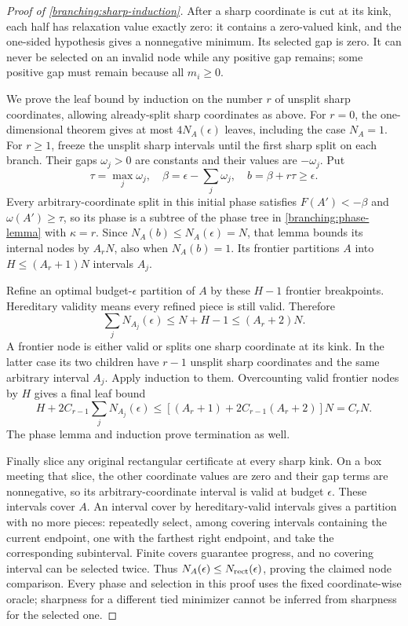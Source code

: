 \begin{proof}[Proof of \cref{branching:sharp-induction}]
After a sharp coordinate is cut at its kink, each half has relaxation
value exactly zero: it contains a zero-valued kink, and the one-sided
hypothesis gives a nonnegative minimum. Its selected gap is zero.
It can never be selected on an invalid node while any positive gap
remains; some positive gap must remain because all $m_i\ge0$.

We prove the leaf bound by induction on the number $r$ of unsplit
sharp coordinates, allowing already-split sharp coordinates as above.
For $r=0$, the one-dimensional theorem gives at most $4N_A(\epsilon)$
leaves, including the case $N_A=1$.
For $r\ge1$, freeze the unsplit sharp intervals until the first sharp
split on each branch. Their gaps $\omega_j>0$ are constants and their
values are $-\omega_j$. Put
\[
 \tau=\max_j\omega_j,\quad
 \beta=\epsilon-\sum_j\omega_j,\quad
 b=\beta+r\tau\ge\epsilon.
\]
Every arbitrary-coordinate split in this initial phase satisfies
$F(A')<-\beta$ and $\omega(A')\ge\tau$, so its phase is a subtree
of the phase tree in \cref{branching:phase-lemma} with $\kappa=r$.
Since $N_A(b)\le N_A(\epsilon)=N$, that lemma bounds its internal
nodes by $A_rN$, also when $N_A(b)=1$. Its frontier partitions $A$
into $H\le(A_r+1)N$ intervals $A_j$.

Refine an optimal budget-$\epsilon$ partition of $A$ by these $H-1$
frontier breakpoints. Hereditary validity means every refined piece
is still valid. Therefore
\begin{equation}
 \sum_jN_{A_j}(\epsilon)\le N+H-1\le(A_r+2)N.
 \label{branching:frontier-budget}
\end{equation}
A frontier node is either valid or splits one sharp coordinate at
its kink. In the latter case its two children have $r-1$ unsplit sharp
coordinates and the same arbitrary interval $A_j$. Apply induction
to them. Overcounting valid frontier nodes by $H$ gives a final leaf
bound
\[
 H+2C_{r-1}\sum_jN_{A_j}(\epsilon)
 \le[(A_r+1)+2C_{r-1}(A_r+2)]N=C_rN.
\]
The phase lemma and induction prove termination as well.

Finally slice any original rectangular certificate at every sharp
kink. On a box meeting that slice, the other coordinate values are
zero and their gap terms are nonnegative, so its arbitrary-coordinate
interval is valid at budget $\epsilon$. These intervals cover $A$.
An interval cover by hereditary-valid intervals gives a partition
with no more pieces: repeatedly select, among covering intervals
containing the current endpoint, one with the farthest right endpoint,
and take the corresponding subinterval. Finite covers guarantee
progress, and no covering interval can be selected twice.
Thus $N_A(\epsilon)\le N_{\rm rect}(\epsilon)$, proving the claimed
node comparison. Every phase and selection in this proof uses the
fixed coordinate-wise oracle; sharpness for a different tied minimizer
cannot be inferred from sharpness for the selected one.
\end{proof}
